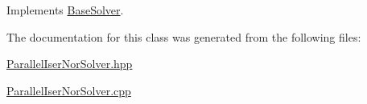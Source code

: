 Implements \hyperlink{classBaseSolver_a66b4a8e6b6e0bb2f3564b2df849c79aa}{Base\+Solver}.



The documentation for this class was generated from the following files\+:\begin{DoxyCompactItemize}
\item 
\hyperlink{ParallelIserNorSolver_8hpp}{Parallel\+Iser\+Nor\+Solver.\+hpp}\item 
\hyperlink{ParallelIserNorSolver_8cpp}{Parallel\+Iser\+Nor\+Solver.\+cpp}\end{DoxyCompactItemize}
